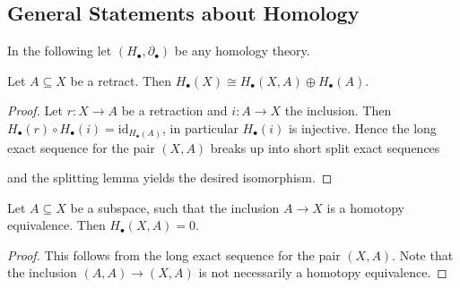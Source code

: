 \subsection{General Statements about Homology}

In the following let $(H_\bullet,\partial_\bullet)$ be any homology theory.

\begin{lemma}
    Let $A \subseteq X$ be a retract. Then $H_\bullet(X) \cong H_\bullet(X,A) \oplus H_\bullet(A)$.
\end{lemma}

\begin{proof}
    Let $r \colon X \to A$ be a retraction and $i \colon A \to X$ the inclusion. Then $H_\bullet(r) \circ H_\bullet(i) = \mathrm{id}_{H_\bullet(A)}$, in particular $H_\bullet(i)$ is injective. Hence the long exact sequence for the pair $(X,A)$ breaks up into short split exact sequences
    \begin{center}
    \end{center}
    and the splitting lemma yields the desired isomorphism.
\end{proof}

\begin{lemma}
    Let $A \subseteq X$ be a subspace, such that the inclusion $A \to X$ is a homotopy equivalence. Then $H_\bullet(X,A) = 0$.
\end{lemma}
\begin{proof}
    This follows from the long exact sequence for the pair $(X,A)$. Note that the inclusion $(A,A) \to (X,A)$ is not necessarily a homotopy equivalence.
\end{proof}

